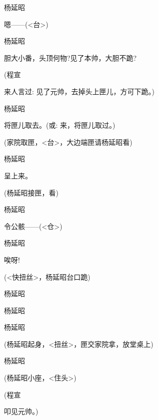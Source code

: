 {杨延昭\hspace{20pt}~

嗯------({\textless{}台\textgreater{}})

杨延昭\hspace{20pt}~

胆大小番，头顶何物?见了本帅，大胆不跪?

(程宣\hspace{30pt}~

来人言过: 见了元帅，去掉头上匣儿，方可下跪。)

杨延昭\hspace{20pt}~

将匣儿取去。({\akai 或}: 来，将匣儿取过。)

(家院取匣，{\textless{}台\textgreater{}，大边端匣请杨延昭看})

杨延昭\hspace{20pt}~

呈上来。

(杨延昭接匣，看)

杨延昭\hspace{20pt}~

令公骸------({\textless{}仓\textgreater{}})

杨延昭\hspace{20pt}~

唉呀!

({\textless{}快扭丝\textgreater{}}，杨延昭台口跪)

杨延昭


杨延昭


杨延昭\hspace{20pt}~


(杨延昭起身，{\textless{}扭丝\textgreater{}}，匣交家院拿，放堂桌上)

杨延昭\hspace{20pt}~


(杨延昭小座，{\textless{}住头\textgreater{}})

(程宣\hspace{30pt}~

叩见元帅。)

}
